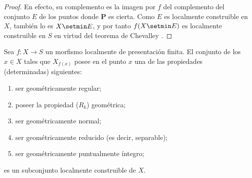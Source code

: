 \begin{proof}
\label{IV.9.9.3-proof}
En efecto, su complemento es la imagen por $f$ del complemento del conjunto $E$ de los puntos donde $\boldsymbol{P}$ es cierta.
Como $E$ es localmente construible en $X$, también lo es $X\setmin E$, y por tanto $f(X\setmin E)$ es localmente construible en $S$ en virtud del teorema de Chevalley .
\end{proof}

\begin{proposition}[9.9.4]
\label{IV.9.9.4}
Sea $f:X\to S$ un morfismo localmente de presentación finita.
El conjunto de los $x\in X$ tales que $X_{f(x)}$ posee en el punto $x$ una de las propiedades (determinadas) siguientes:
\begin{enumerate}[label=\textup{(\roman*)}]
  \item ser geométricamente regular;
  \item poseer la propiedad ($R_k$) geométrica;
  \item ser geométricamente normal;
  \item ser geométricamente reducido \textup{(es decir,} separable\textup{)};
  \item ser geométricamente puntualmente íntegro;
\end{enumerate}
es un subconjunto localmente construible de $X$.
\end{proposition}

